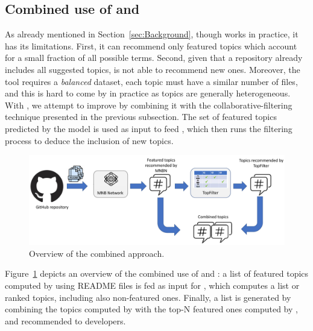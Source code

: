 \subsection{Combined use of \TFb and \MNB} \label{sec:combined_approach}


As already mentioned in Section~\ref{sec:Background}, though \MNB works in 
practice, it has its limitations. First, it can recommend only featured topics 
which account for a small fraction of all possible terms. Second, given that a 
repository already includes all suggested topics, \MNB is not able to recommend 
new ones. Moreover, the tool requires a \emph{balanced} dataset, \ie each topic 
must have a similar number of \RM files, and this is hard to come by in 
practice as topics are generally heterogeneous. With \TFb, we attempt to 
improve \MNB by combining it with the collabora\-tive-filtering technique 
presented in the previous subsection. The set of featured topics predicted by 
the \MNB model is used as input to feed \TFa, which then runs the filtering 
process to deduce the inclusion of new topics.

\begin{figure}[h!]
	\centering
	\includegraphics[width=\linewidth]{figs/entangled.pdf}
	\caption{Overview of the combined approach.}
	\label{fig:entangled}
\end{figure}

Figure~\ref{fig:entangled} depicts an overview of the combined use of \MNB and 
\TFb: a 
list of featured topics computed by \MNB using README files is fed as input for 
\TFa, which computes a list or ranked topics, including also non-featured ones. 
Finally, a list is generated by combining the topics computed by \TF with the 
top-N featured ones computed by \MNB, and recommended to developers.




